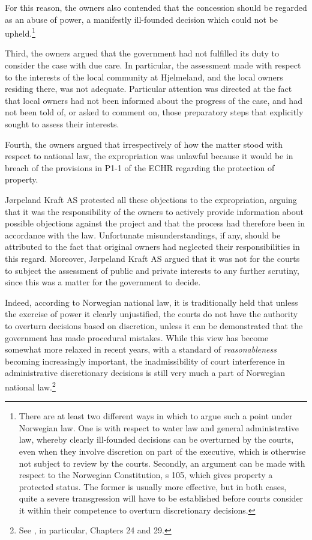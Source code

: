 For this reason, the owners also contended that the concession should be regarded as an abuse of power, a manifestly ill-founded decision which could not be upheld.\footnote{There are at least two different ways in which to argue such a point under Norwegian law. One is with respect to water law and general administrative law, whereby clearly ill-founded decisions can be overturned by the courts, even when they involve discretion on part of the executive, which is otherwise not subject to review by the courts. Secondly, an argument can be made with respect to the Norwegian Constitution, s 105, which gives property a protected status. The former is usually more effective, but in both cases, quite a severe transgression will have to be established before courts consider it within their competence to overturn discretionary decisions.} 

Third, the owners argued that the government had not fulfilled its duty to consider the case with due care. In particular, the assessment made with respect to the interests of the local community at Hjelmeland, and the local owners residing there, was not adequate. Particular attention was directed at the fact that local owners had not been informed about the progress of the case, and had not been told of, or asked to comment on, those preparatory steps that explicitly sought to assess their interests.

Fourth, the owners argued that irrespectively of how the matter stood with respect to national law, the expropriation was unlawful because it would be in breach of the provisions in P1-1 of the ECHR regarding the protection of property.

Jørpeland Kraft AS protested all these objections to the expropriation, arguing that it was the responsibility of the owners to actively provide information about possible objections against the project and that the process had therefore been in accordance with the law. Unfortunate misunderstandings, if any, should be attributed to the fact that original owners had neglected their responsibilities in this regard. Moreover, Jørpeland Kraft AS argued that it was not for the courts to subject the assessment of public and private interests to any further scrutiny, since this was a matter for the government to decide.

Indeed, according to Norwegian national law, it is traditionally held that unless the exercise of power it clearly unjustified, the courts do not have the authority to overturn decisions based on discretion, unless it can be demonstrated that the government has made procedural mistakes. While this view has become somewhat more relaxed in recent years, with a standard of \emph{reasonableness} becoming increasingly important, the inadmissibility of court interference in administrative discretionary decisions is still very much a part of Norwegian national law.\footnote{See \cite{eckhoff14}, in particular, Chapters 24 and 29.}

